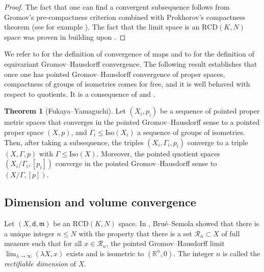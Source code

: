 \documentclass[12pt]{amsart}
\theoremstyle{definition}
\def\fnum{equation}
\newtheorem{theorem}[\fnum]{Theorem}
\numberwithin{equation}{section}
\newcommand{\iso}{\text{Iso}}
\newcommand{\rcd}{\text{RCD}}
\newcommand{\mm}{\mathfrak{m}}
\begin{document}
\begin{proof}
The fact that one can find a convergent subsequence follows from Gromov's pre-compactness criterion  \cite[Proposition 5.2]{gromov-ms} combined with Prokhorov's compactness theorem (see for example \cite[Theorem 27.32]{villani}). The fact that the limit space is an  $\rcd (K,N)$ space was proven in \cite{gigli-mondino-savare} building upon \cite{lott-villani, sturm-i, sturm-ii, ambrosio-gigli-savare}. %
\end{proof}




We refer to \cite{gromov-polynomial} for the definition of convergence of maps and to \cite{fukaya-yamaguchi} for the definition of equivariant Gromov--Hausdorff convergence. The following result establishes that once one has pointed Gromov--Hausdorff convergence of proper spaces, compactness of groups of isometries comes for free, and it is well behaved with respect to quotients. It is a consequence of \cite[Proposition 3.6]{fukaya-yamaguchi} and \cite[Theorem 2.1]{fukaya-convergence}.

\begin{theorem}[Fukaya--Yamaguchi]\label{thm:fukaya-yamaguchi}
Let $(X_i, p_i)$ be a sequence of pointed proper metric spaces that converges in the pointed Gromov--Hausdorff sense to a pointed proper space $(X,p)$, and $\Gamma_i\leq \iso (X_i)$ a sequence of groups of isometries. Then, after taking a subsequence, the triples $(X_i, \Gamma_i, p_i)$ converge to a triple $(X, \Gamma , p )$ with $\Gamma \leq \iso (X)$. Moreover, the pointed quotient spaces $(X_i / \Gamma_i , [p_i])$ converge in the pointed Gromov--Hausdorff sense to $(X/\Gamma, [p])$.
\end{theorem}



\subsection{Dimension and volume convergence} 

Let $(X,\mathsf{d} ,\mm)$ be an $\rcd (K,N)$ space. In \cite{brue-semola}, Bru\'e--Semola showed that there is a unique integer $n \leq N$ with the property that there is a set $\mathcal{R}_n \subset X$ of full measure such that for all $x\in \mathcal{R}_n$, the pointed Gromov--Hausdorff limit $\lim_{\lambda \to \infty }(\lambda X, x)$ exists and is isometric to $(\mathbb{R}^n, 0)$. The integer $n$ is called  the  \emph{rectifiable dimension} of $X$. 
\end{document}
